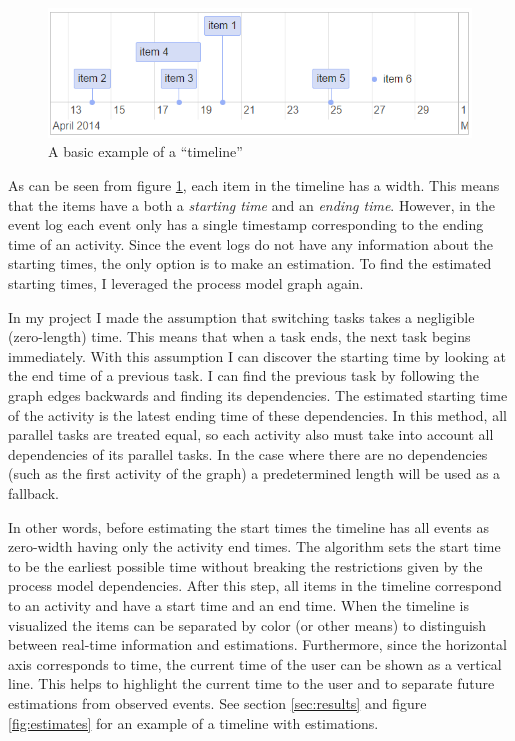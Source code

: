 \begin{figure}[htb]
    \centering \includegraphics[width=0.8\linewidth]{gfx/screenshots/basictimeline.png}
    \caption{A basic example of a ``timeline''}
    \label{fig:basictimeline}
\end{figure}

As can be seen from figure \ref{fig:basictimeline}, each item in the timeline has a width.
This means that the items have a both a \textit{starting time} and an \textit{ending time}.
However, in the event log each event only has a single timestamp corresponding to the ending time of an activity.
Since the event logs do not have any information about the starting times, the only option is to make an estimation.
To find the estimated starting times, I leveraged the process model graph again.

In my project I made the assumption that switching tasks takes a negligible (zero-length) time.
This means that when a task ends, the next task begins immediately.
With this assumption I can discover the starting time by looking at the end time of a previous task.
I can find the previous task by following the graph edges backwards and finding its dependencies.
The estimated starting time of the activity is the latest ending time of these dependencies.
In this method, all parallel tasks are treated equal, so each activity also must take into account all dependencies of its parallel tasks.
In the case where there are no dependencies (such as the first activity of the graph) a predetermined length will be used as a fallback.

In other words, before estimating the start times the timeline has all events as zero-width having only the activity end times. The algorithm sets the start time to be the earliest possible time without breaking the restrictions given by the process model dependencies.
After this step, all items in the timeline correspond to an activity and have a start time and an end time.
When the timeline is visualized the items can be separated by color (or other means) to distinguish between real-time information and estimations.
Furthermore, since the horizontal axis corresponds to time, the current time of the user can be shown as a vertical line.
This helps to highlight the current time to the user and to separate future estimations from observed events.
See section \ref{sec:results} and figure \ref{fig:estimates} for an example of a timeline with estimations.

